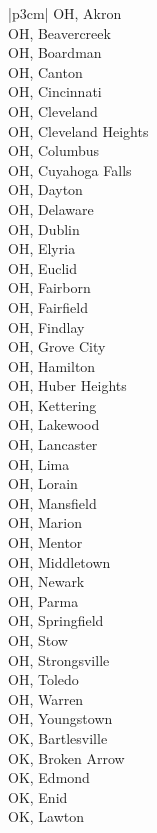 \begin{customLongTable}{ |p{3cm}| }
OH, Akron \\ \hline
OH, Beavercreek \\ \hline
OH, Boardman \\ \hline
OH, Canton \\ \hline
OH, Cincinnati \\ \hline
OH, Cleveland \\ \hline
OH, Cleveland Heights \\ \hline
OH, Columbus \\ \hline
OH, Cuyahoga Falls \\ \hline
OH, Dayton \\ \hline
OH, Delaware \\ \hline
OH, Dublin \\ \hline
OH, Elyria \\ \hline
OH, Euclid \\ \hline
OH, Fairborn \\ \hline
OH, Fairfield \\ \hline
OH, Findlay \\ \hline
OH, Grove City \\ \hline
OH, Hamilton \\ \hline
OH, Huber Heights \\ \hline
OH, Kettering \\ \hline
OH, Lakewood \\ \hline
OH, Lancaster \\ \hline
OH, Lima \\ \hline
OH, Lorain \\ \hline
OH, Mansfield \\ \hline
OH, Marion \\ \hline
OH, Mentor \\ \hline
OH, Middletown \\ \hline
OH, Newark \\ \hline
OH, Parma \\ \hline
OH, Springfield \\ \hline
OH, Stow \\ \hline
OH, Strongsville \\ \hline
OH, Toledo \\ \hline
OH, Warren \\ \hline
OH, Youngstown \\ \hline
OK, Bartlesville \\ \hline
OK, Broken Arrow \\ \hline
OK, Edmond \\ \hline
OK, Enid \\ \hline
OK, Lawton \\ \hline

\end{customLongTable}
